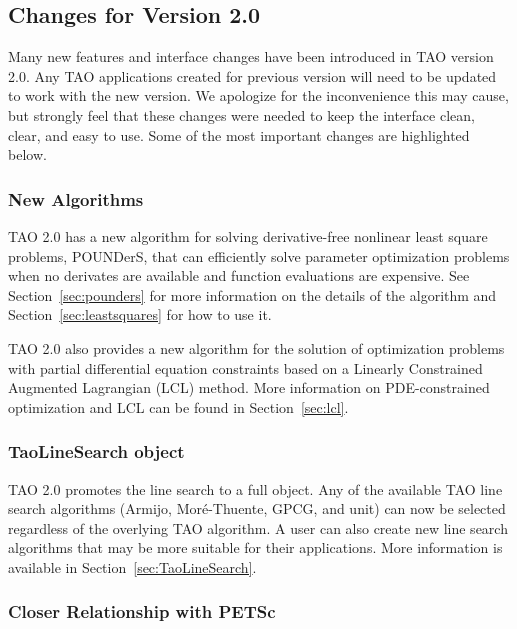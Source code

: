 \subsection*{Changes for Version 2.0}

Many new features and interface changes have been introduced in TAO version 2.0.
Any TAO applications created for previous version will need to be updated to 
work with the new version.  We apologize for the inconvenience this may cause, 
but strongly feel that these changes were needed to keep the interface clean, 
clear, and easy to use. Some of the most important changes are highlighted 
below.

\subsubsection*{New Algorithms}

TAO 2.0 has a new algorithm for solving derivative-free nonlinear least
square 
problems, POUNDerS, that can efficiently solve parameter optimization problems 
when no derivates are available and function evaluations are expensive.  See 
Section~\ref{sec:pounders} for more information on the details of the 
algorithm and Section~\ref{sec:leastsquares} for how to use it.

TAO 2.0 also provides a new algorithm for the solution of optimization
problems with partial differential equation constraints based on a
Linearly Constrained Augmented Lagrangian (LCL) method.  More 
information on PDE-constrained optimization and LCL can be found 
in Section~\ref{sec:lcl}.

\subsubsection*{TaoLineSearch object}

TAO 2.0 promotes the line search to a full object.  Any of the available 
TAO line search algorithms (Armijo, Mor\'e-Thuente, GPCG, and unit) can now 
be selected regardless of the overlying TAO algorithm.  A user can also
create new line search algorithms that may be more suitable for their
applications.  More information is available in 
Section~\ref{sec:TaoLineSearch}.

\subsubsection*{Closer Relationship with PETSc}

